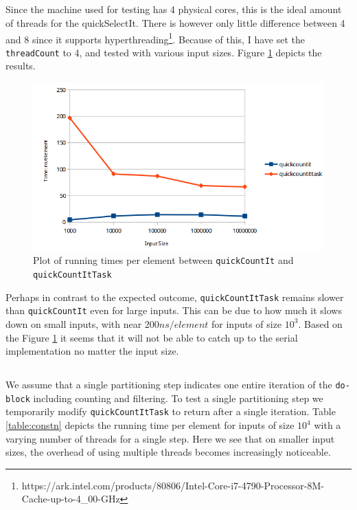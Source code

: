 \documentclass[a5paper]{article}
\begin{document}
\subsection{}
Since the machine used for testing has 4 physical cores, this is the ideal amount of threads for the quickSelectIt. There is however only little difference between 4 and 8 since it supports hyperthreading\footnote{https://ark.intel.com/products/80806/Intel-Core-i7-4790-Processor-8M-Cache-up-to-4\_00-GHz}. Because of this, I have set the \texttt{threadCount} to 4, and tested with various input sizes. Figure \ref{fig:compTask} depicts the results. 
\begin{figure}[!ht]
    \centering
    \noindent\includegraphics[scale=0.5]{res/graph_task.png}
    \caption{Plot of running times per element between \texttt{quickCountIt} and \texttt{quickCountItTask}}
    \label{fig:compTask}
\end{figure}

Perhaps in contrast to the expected outcome, \texttt{quickCountItTask} remains slower than \texttt{quickCountIt} even for large inputs. This can be due to how much it slows down on small inputs, with near $200ns/element$ for inputs of size $10^3$. Based on the Figure \ref{fig:compTask} it seems that it will not be able to catch up to the serial implementation no matter the input size.

\subsection{}
We assume that a single partitioning step indicates one entire iteration of the \texttt{do-block} including counting and filtering. To test a single partitioning step we temporarily modify \texttt{quickCountItTask} to return after a single iteration. Table \ref{table:constn} depicts the running time per element for inputs of size $10^4$ with a varying number of threads for a single step. Here we see that on smaller input sizes, the overhead of using multiple threads becomes increasingly noticeable.
\end{document}
